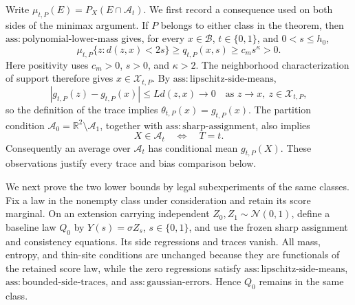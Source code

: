 Write \(\mu_{t,P}(E)=P_X(E\cap\mathcal A_t)\).  We first record a consequence used on both sides of the minimax argument.  If \(P\) belongs to either class in the theorem, then \(\mathrm{ass:polynomial\text{-}lower\text{-}mass}\) gives, for every \(x\in\mathcal B\), \(t\in\{0,1\}\), and \(0<s\le h_0\),
\[
 \mu_{t,P}\{z:d(z,x)<2s\}\ge q_{t,P}(x,s)
 \ge c_m s^\kappa>0.
\]
Here positivity uses \(c_m>0\), \(s>0\), and \(\kappa>2\).  The neighborhood characterization of support therefore gives \(x\in\mathcal X_{t,P}\).  By \(\mathrm{ass:lipschitz\text{-}side\text{-}means}\),
\[
 |g_{t,P}(z)-g_{t,P}(x)|\le Ld(z,x)\longrightarrow0
 \quad\text{as }z\to x,\ z\in\mathcal X_{t,P},
\]
so the definition of the trace implies \(\theta_{t,P}(x)=g_{t,P}(x)\).  The partition condition \(\mathcal A_0=\mathbb R^2\setminus\mathcal A_1\), together with \(\mathrm{ass:sharp\text{-}assignment}\), also implies
\[
 X\in\mathcal A_t\quad\Longleftrightarrow\quad T=t.
\]
Consequently an average over \(\mathcal A_t\) has conditional mean \(g_{t,P}(X)\).  These observations justify every trace and bias comparison below.

We next prove the two lower bounds by legal subexperiments of the same classes.  Fix a law in the nonempty class under consideration and retain its score marginal.  On an extension carrying independent \(Z_0,Z_1\sim\mathcal N(0,1)\), define a baseline law \(Q_0\) by \(Y(s)=\sigma Z_s\), \(s\in\{0,1\}\), and use the frozen sharp assignment and consistency equations.  Its side regressions and traces vanish.  All mass, entropy, and thin-site conditions are unchanged because they are functionals of the retained score law, while the zero regressions satisfy \(\mathrm{ass:lipschitz\text{-}side\text{-}means}\), \(\mathrm{ass:bounded\text{-}side\text{-}traces}\), and \(\mathrm{ass:gaussian\text{-}errors}\).  Hence \(Q_0\) remains in the same class.

